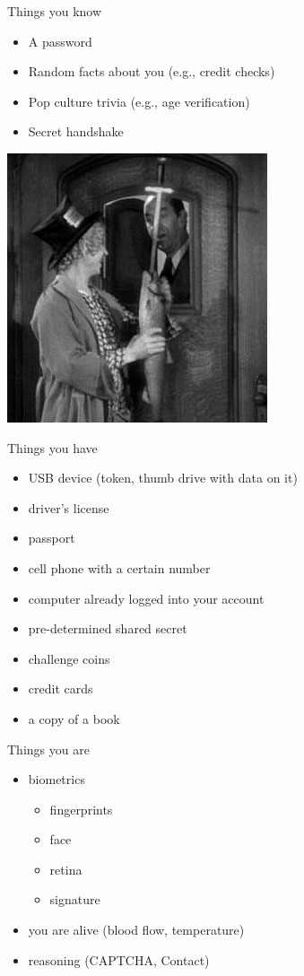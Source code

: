\documentclass{beamer}
\begin{document}
\begin{frame}{Things you know}

\begin{itemize}
  \item A password
  \item Random facts about you (e.g., credit checks)
  \item Pop culture trivia (e.g., age verification)
  \item Secret handshake
\end{itemize}

\begin{center}
  \includegraphics[width=.4\textwidth]{swordfish.jpg}
\end{center}

\end{frame}

\begin{frame}{Things you have}

\begin{itemize}
  \item USB device (token, thumb drive with data on it)
  \item driver's license
  \item passport
  \item cell phone with a certain number
  \item computer already logged into your account
  \item pre-determined shared secret
  \item challenge coins
  \item credit cards
  \item a copy of a book
\end{itemize}
\end{frame}

\begin{frame}{Things you are}

\begin{itemize}
  \item biometrics
  \begin{itemize}
    \item fingerprints
    \item face
    \item retina
    \item signature
  \end{itemize}
  \item you are alive (blood flow, temperature)
  \item reasoning (CAPTCHA, Contact)
\end{itemize}
\end{frame}
\end{document}
